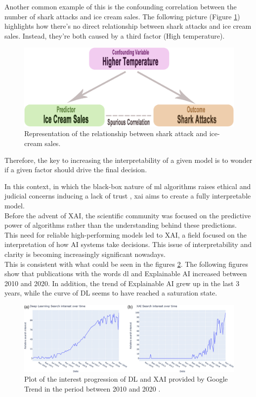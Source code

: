 Another common example of this is the confounding correlation between the number of shark attacks and ice cream sales. 
The following picture (Figure \ref{fig:shark}) \cite{shark-icecream} highlights how there's no direct relationship between shark attacks and ice cream sales. Instead, they're both caused by a third factor (High temperature).\newline
\begin{figure}[H]
    \centering
    \includegraphics[scale=0.25]{images/confounding.png}
    \caption{Representation of the relationship between shark attack and ice-cream sales.}
    \label{fig:shark}
\end{figure}
Therefore, the key to increasing the interpretability of a given model is to wonder if a given factor should drive the final decision.\par
In this context, in which the black-box nature of \acrshort{ml} algorithms raises ethical and judicial concerns inducing a lack of trust \cite{9141213}, \gls{xai} aims to create a fully interpretable model.\\
Before the advent of XAI, the scientific community was focused on the predictive power of algorithms rather than the understanding behind these predictions.\\
This need for reliable high-performing models led to XAI, a field focused on the interpretation of how AI systems take decisions.
This issue of interpretability and clarity is becoming increasingly significant nowadays. \\
This is consistent with what could be seen in the figures \ref{fig:AI_XAI}.
The following figures show that publications with the words \gls{dl} and Explainable AI increased between 2010 and 2020. 
In addition, the trend of Explainable AI grew up in the last 3 years, while the curve of DL seems to have reached a saturation state.\\
\begin{figure}[H]
\centering
    \includegraphics[scale=0.30]{images/DL-XAI.jpg}
    \caption{Plot of the interest progression of DL and XAI provided by Google Trend in the period between 2010 and 2020 \cite{angelov2021explainable}.}
    \label{fig:AI_XAI}
\end{figure}

